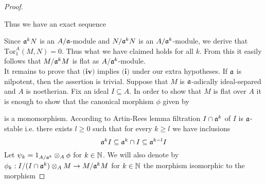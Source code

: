\begin{proof}
\begin{center}
\end{center}
Thus we have an exact sequence
\begin{center}
\end{center}
Since $\mathfrak{a}^kN$ is an $A/\mathfrak{a}$-module and $N/\mathfrak{a}^kN$ is an $A/\mathfrak{a}^k$-module, we derive that $\mathrm{Tor}^A_1(M,N)=0$. Thus what we have claimed holds for all $k$. From this it easily follows that $M/\mathfrak{a}^kM$ is flat as $A/\mathfrak{a}^k$-module.\\
It remains to prove that $\textbf{(iv)}$ implies $\textbf{(i)}$ under our extra hypotheses. If $\mathfrak{a}$ is nilpotent, then the assertion is trivial. Suppose that $M$ is $\mathfrak{a}$-adically ideal-separed and $A$ is noetherian. Fix an ideal $I\subseteq A$. In order to show that $M$ is flat over $A$ it is enough to show that the canonical morphism $\phi$ given by
\begin{center}
\end{center} 
is a monomorphism. According to Artin-Rees lemma filtration $I\cap \mathfrak{a}^k$ of $I$ is $\mathfrak{a}$-stable i.e. there exists $l\geq 0$ such that for every $k\geq l$ we have inclusions
$$\mathfrak{a}^kI\subseteq \mathfrak{a}^k\cap I\subseteq \mathfrak{a}^{k-l}I$$
Let $\psi_k=1_{A/\mathfrak{a}^k}\otimes_A\phi$ for $k\in {\mathbb N}$. We will also denote by $\phi_k:I/(I\cap \mathfrak{a}^k)\otimes_AM\rightarrow M/\mathfrak{a}^kM$ for $k\in {\mathbb N}$ the morphism isomorphic to the morphism

\end{proof}
